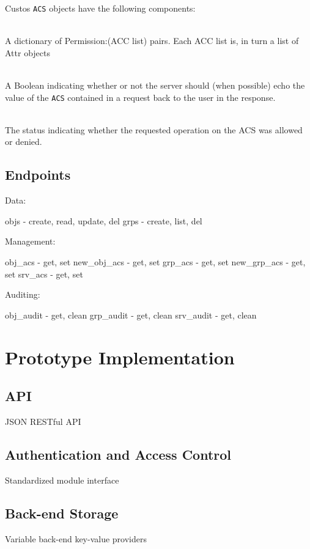 \noindent
Custos \texttt{ACS} objects have the following components:

\begin{packed_desc}
\item[\texttt{Permissions}] \hfill \\ A dictionary of Permission:(ACC
  list) pairs. Each ACC list is, in turn a list of Attr objects
\item[\texttt{Echo}] \hfill \\ A Boolean indicating whether or not the
  server should (when possible) echo the value of the \texttt{ACS}
  contained in a request back to the user in the response.
\item[\texttt{Status} (Response Only)] \hfill \\ The status indicating
  whether the requested operation on the ACS was allowed or denied.
\end{packed_desc}

\subsection{Endpoints}

Data:

objs - create, read, update, del
grps - create, list, del

Management:

obj\_acs - get, set
new\_obj\_acs - get, set
grp\_acs - get, set
new\_grp\_acs - get, set
srv\_acs - get, set

Auditing:

obj\_audit - get, clean
grp\_audit - get, clean
srv\_audit - get, clean

\section{Prototype Implementation}

\subsection{API}

JSON RESTful API

\subsection{Authentication and Access Control}

Standardized module interface

\subsection{Back-end Storage}

Variable back-end key-value providers

